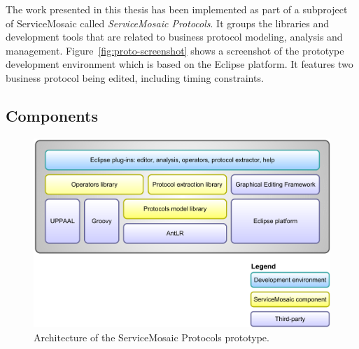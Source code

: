 The work presented in this thesis has been implemented as part of a subproject of ServiceMosaic called \emph{ServiceMosaic Protocols}. It groups the libraries and development tools that are related to business protocol modeling, analysis and management. Figure~\ref{fig:proto-screenshot} shows a screenshot of the prototype development environment which is based on the Eclipse platform. It features two business protocol being edited, including timing constraints.


\subsection{Components}


\begin{figure}[tbhp]
    \centering
    \includegraphics[width=\textwidth]{content/protocols-project/protocols-proto-layers}
    \caption{Architecture of the ServiceMosaic Protocols prototype.}
    \label{fig:protocols-proto-layers}
\end{figure}

